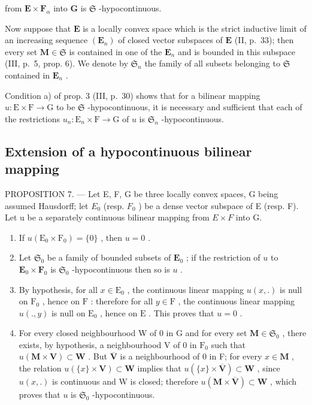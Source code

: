 from \(\mathbf{E} \times \mathbf{F}_{\alpha}\) into \(\mathbf{G}\) is \(\mathfrak{S}\) -hypocontinuous.

Now suppose that \(\mathbf{E}\) is a locally convex space which is the strict inductive limit of an increasing sequence \((\mathbf{E}_n)\) of closed vector subspaces of \(\mathbf{E}\) (II, p.~33); then every set \(\mathbf{M} \in \mathfrak{S}\) is contained in one of the \(\mathbf{E}_n\) and is bounded in this subspace (III, p.~5, prop. 6). We denote by \(\mathfrak{S}_n\) the family of all subsets belonging to \(\mathfrak{S}\) contained in \(\mathbf{E}_n\) .

Condition a) of prop. 3 (III, p.~30) shows that for a bilinear mapping \(u: \mathrm{E} \times \mathrm{F} \to \mathrm{G}\) to be \(\mathfrak{S}\) -hypocontinuous, it is necessary and sufficient that each of the restrictions \(u_n: \mathrm{E}_n \times \mathrm{F} \to \mathrm{G}\) of \(u\) is \(\mathfrak{S}_n\) -hypocontinuous.

\subsection{Extension of a hypocontinuous bilinear mapping}

PROPOSITION 7. --- Let E, F, G be three locally convex spaces, G being assumed Hausdorff; let \(E_{0}\) (resp. \(F_{0}\) ) be a dense vector subspace of E (resp. F). Let u be a separately continuous bilinear mapping from \(E \times F\) into G.

\begin{enumerate}
\def\labelenumi{\arabic{enumi})}
\item
  If \(u(\mathrm{E}_0 \times \mathrm{F}_0) = \{0\}\) , then \(u = 0\) .
\item
  Let \(\mathfrak{S}_0\) be a family of bounded subsets of \(\mathbf{E}_0\) ; if the restriction of \(u\) to \(\mathbf{E}_0 \times \mathbf{F}_0\) is \(\mathfrak{S}_0\) -hypocontinuous then so is \(u\) .
\item
  By hypothesis, for all \(x \in \mathrm{E}_0\) , the continuous linear mapping \(u(x, .)\) is null on \(\mathrm{F}_0\) , hence on \(\mathrm{F}\) : therefore for all \(y \in \mathrm{F}\) , the continuous linear mapping \(u(., y)\) is null on \(\mathrm{E}_0\) , hence on \(\mathrm{E}\) . This proves that \(u = 0\) .
\item
  For every closed neighbourhood W of 0 in G and for every set \(\mathbf{M} \in \mathfrak{S}_0\) , there exists, by hypothesis, a neighbourhood V of 0 in \(\mathrm{F}_0\) such that \(u(\mathbf{M} \times \mathbf{V}) \subset \mathbf{W}\) . But \(\overline{\mathbf{V}}\) is a neighbourhood of 0 in F; for every \(x \in \mathbf{M}\) , the relation \(u(\{x\} \times \mathbf{V}) \subset \mathbf{W}\) implies that \(u(\{x\} \times \overline{\mathbf{V}}) \subset \mathbf{W}\) , since \(u(x, .)\) is continuous and W is closed; therefore \(u(\mathbf{M} \times \overline{\mathbf{V}}) \subset \mathbf{W}\) , which proves that \(u\) is \(\mathfrak{S}_0\) -hypocontinuous.
\end{enumerate}

